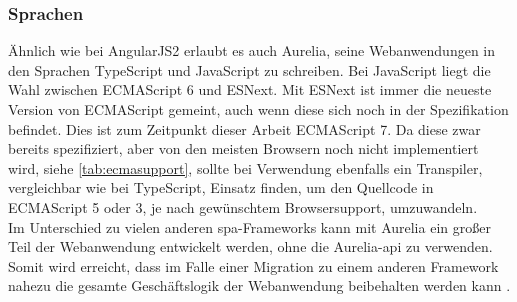 \subsubsection{Sprachen}
Ähnlich wie bei AngularJS2 erlaubt es auch Aurelia, seine Webanwendungen in den Sprachen TypeScript und JavaScript zu schreiben. Bei JavaScript liegt die Wahl zwischen ECMAScript 6 und ESNext. Mit ESNext ist immer die neueste Version von ECMAScript gemeint, auch wenn diese sich noch in der Spezifikation befindet. Dies ist zum Zeitpunkt dieser Arbeit ECMAScript 7. Da diese zwar bereits spezifiziert, aber von den meisten Browsern noch nicht implementiert wird, siehe \autoref{tab:ecmasupport}, sollte bei Verwendung ebenfalls ein Transpiler, vergleichbar wie bei TypeScript, Einsatz finden, um den Quellcode in ECMAScript 5 oder 3, je nach gewünschtem Browsersupport, umzuwandeln.\\
Im Unterschied zu vielen anderen \ac{spa}-Frameworks kann mit Aurelia ein großer Teil der Webanwendung entwickelt werden, ohne die Aurelia-\ac{api} zu verwenden. Somit wird erreicht, dass im Falle einer Migration zu einem anderen Framework nahezu die gesamte Geschäftslogik der Webanwendung beibehalten werden kann \cite{Inc.2016b}.